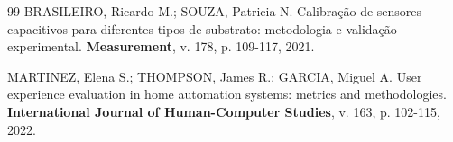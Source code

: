 \begin{thebibliography}{99}
BRASILEIRO, Ricardo M.; SOUZA, Patricia N. Calibração de sensores capacitivos para diferentes tipos de substrato: metodologia e validação experimental. \textbf{Measurement}, v. 178, p. 109-117, 2021.

MARTINEZ, Elena S.; THOMPSON, James R.; GARCIA, Miguel A. User experience evaluation in home automation systems: metrics and methodologies. \textbf{International Journal of Human-Computer Studies}, v. 163, p. 102-115, 2022.

\end{thebibliography}


